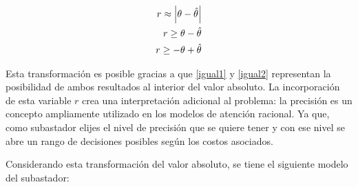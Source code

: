 \begin{align}
   r \approx \abs{\theta - \hat{\theta}}\\
   r \geq \theta - \hat{\theta}\label{igual1}\\
   r \geq -\theta + \hat{\theta}\label{igual2}
\end{align}

Esta transformación es posible gracias a que \ref{igual1} y \ref{igual2} representan la posibilidad de ambos resultados al interior del valor absoluto. La incorporación de esta variable $r$ crea una interpretación adicional al problema:  la precisión es un concepto ampliamente utilizado en los modelos de atención racional. Ya que, como subastador elijes el nivel de precisión que se quiere tener y con ese nivel se abre un rango de decisiones posibles según los costos asociados. 
\vspace{2.5mm}

Considerando esta transformación del valor absoluto, se tiene el siguiente modelo del subastador:
\newpage

